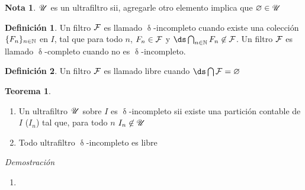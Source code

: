 \documentclass{article}
\theoremstyle{definition}
\newtheorem{definition}{Definición}[section]
\newtheorem{theorem}{Teorema}[section]
\newtheorem*{note}{Nota}
\begin{document}
\begin{note}
  $\mathscr{U}$ es un ultrafiltro sii, agregarle otro elemento implica que $\varnothing \in \mathscr{U}$
\end{note}


\begin{definition}
  Un filtro $\mathcal{F}$ es llamado $\updelta$-incompleto cuando existe una colección
  $\{F_n\}_{n\in\mathbb{N}}$ en $I$, tal que para todo $n$, $F_n \in \mathcal{F}$ y
  $\ds\bigcap_{n\in\N} F_n \not\in \F$. Un filtro $\mathcal{F}$ es llamado $\updelta$-completo
  cuando no es $\updelta$-incompleto.
\end{definition}
\begin{definition}
  Un filtro $\mathcal{F}$ es llamado libre cuando $\ds\bigcap\F = \varnothing$
\end{definition}

\begin{theorem}
  \begin{enumerate}
    \item Un ultrafiltro $\mathscr{U}$ sobre $I$ es $\updelta$-incompleto sii existe
          una partición contable de $I$ ($I_n$) tal que, para todo $n$
          $I_n \not\in \mathscr{U}$
    \item Todo ultrafiltro $\updelta$-incompleto es libre
  \end{enumerate}
\end{theorem}

\begin{proofbox}{\textit{Demostración}}
  \begin{enumerate}
    \item 
  \end{enumerate}
\end{proofbox}
\end{document}

